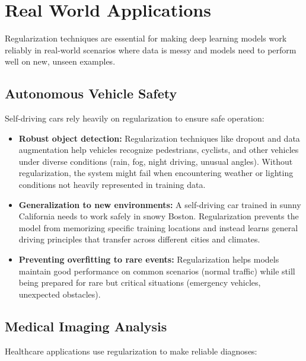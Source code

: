 
\section{Real World Applications}
\label{sec:regularization-real-world}

Regularization techniques are essential for making deep learning models work reliably in real-world scenarios where data is messy and models need to perform well on new, unseen examples.

\subsection{Autonomous Vehicle Safety}

Self-driving cars rely heavily on regularization to ensure safe operation:

\begin{itemize}
    \item \textbf{Robust object detection:} Regularization techniques like dropout and data augmentation help vehicles recognize pedestrians, cyclists, and other vehicles under diverse conditions (rain, fog, night driving, unusual angles). Without regularization, the system might fail when encountering weather or lighting conditions not heavily represented in training data.
    
    \item \textbf{Generalization to new environments:} A self-driving car trained in sunny California needs to work safely in snowy Boston. Regularization prevents the model from memorizing specific training locations and instead learns general driving principles that transfer across different cities and climates.
    
    \item \textbf{Preventing overfitting to rare events:} Regularization helps models maintain good performance on common scenarios (normal traffic) while still being prepared for rare but critical situations (emergency vehicles, unexpected obstacles).
\end{itemize}

\subsection{Medical Imaging Analysis}

Healthcare applications use regularization to make reliable diagnoses:

